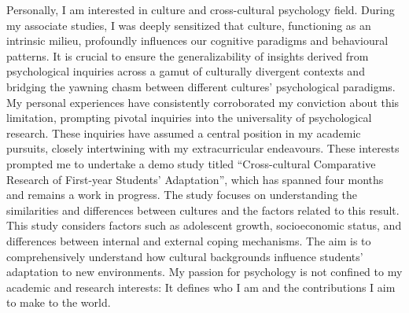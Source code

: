 \documentclass[]{article}
\begin{document}

Personally, I am interested in culture and cross-cultural psychology field.
During my associate studies, I was deeply sensitized that culture, functioning as an intrinsic milieu, profoundly influences our cognitive paradigms and behavioural patterns.
It is crucial to ensure the generalizability of insights derived from psychological inquiries across a gamut of culturally divergent contexts and bridging the yawning chasm between different cultures' psychological paradigms.
My personal experiences have consistently corroborated my conviction about this limitation, prompting pivotal inquiries into the universality of psychological research.
These inquiries have assumed a central position in my academic pursuits, closely intertwining with my extracurricular endeavours.
These interests prompted me to undertake a demo study titled ``Cross-cultural Comparative Research of First-year Students' Adaptation'', which has spanned four months and remains a work in progress.
The study focuses on understanding the similarities and differences between cultures and the factors related to this result.
This study considers factors such as adolescent growth, socioeconomic status, and differences between internal and external coping mechanisms.
The aim is to comprehensively understand how cultural backgrounds influence students' adaptation to new environments.
My passion for psychology is not confined to my academic and research interests: It defines who I am and the contributions I aim to make to the world.
\end{document}
